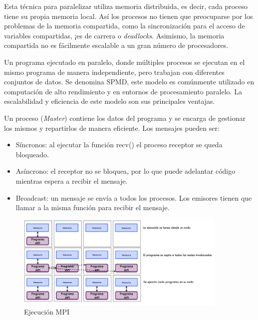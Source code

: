 	\newpage

	Esta técnica para paralelizar utiliza memoria distribuida, es decir, cada proceso tiene su propia memoria local. Así los procesos no tienen que preocuparse por los problemas de la memoria compartida, como la sincronización para el acceso de variables compartidas, ¡es de carrera o \textit{deadlocks}. Asimismo, la memoria compartida no es fácilmente escalable a un gran número de procesadores\cite{jjruiz2016compartida}.


	Un programa ejecutado en paralelo, donde múltiples procesos se ejecutan en el mismo programa de manera independiente, pero trabajan con diferentes conjuntos de datos. Se denomina SPMD, este modelo es comúnmente utilizado en computación de alto rendimiento y en entornos de procesamiento paralelo. La escalabilidad y eficiencia de este modelo son sus principales ventajas.

	Un proceso (\textit{Master}) contiene los datos del programa y se encarga de gestionar los mismos y repartirlos de manera eficiente. Los mensajes pueden ser:

	\begin{itemize}
		\item Síncronos: al ejecutar la función recv() el proceso receptor se queda bloqueado.
		\item Asíncrono: el receptor no se bloquea, por lo que puede adelantar código mientras espera a recibir el mensaje.
		\item Broadcast: un mensaje se envía a todos los procesos. Los emisores tienen que llamar a la misma función para recibir el mensaje.
	\end{itemize}


	\vspace{-0.2cm}

	\begin{figure}[!h]
		\centering
		\includegraphics[width=0.9\textwidth]{images/chapter_2/mpi_2}
		\caption{Ejecución MPI}
		\label{fig:ejecucion_mpi}
	\end{figure}

